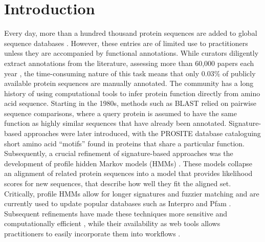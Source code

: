 \section*{Introduction}
Every day, more than a hundred thousand protein sequences are added to global sequence databases \cite{tremblstats}. However, these entries are of limited use to practitioners unless they are accompanied by functional annotations. While curators diligently extract annotations from the literature, assessing more than 60,000 papers each year \cite{uniprotlatest}, the time-consuming nature of this task means that only 0.03\% of publicly available protein sequences are manually annotated.
The community has a long history of using computational tools to infer protein function directly from amino acid sequence. Starting in the 1980s, methods such as BLAST \cite{blast} relied on pairwise sequence comparisons, where a query protein is assumed to have the same function as highly similar sequences that have already been annotated. Signature-based approaches were later introduced, with the PROSITE database \cite{bairoch1991prosite} cataloguing short amino acid ``motifs'' found in proteins that share a particular function. Subsequently, a crucial refinement of signature-based approaches was the development of profile hidden Markov models (HMMs) \cite{krogh1994hidden, eddyhmmreview}. These models collapse an alignment of related protein sequences into a model that provides likelihood scores for new sequences, that describe how well they fit the aligned set. Critically, profile HMMs allow for longer signatures and fuzzier matching and are currently used to update popular databases such as Interpro and Pfam \cite{pfamlatest, blum2021interpro}. Subsequent refinements have made these techniques more sensitive and computationally efficient \cite{altschul1997gapped, fasterhmmer, pfamlatest, soding2005protein, steinegger2019hh}, while their availability as web tools allows practitioners to easily incorporate them into workflows \cite{johnson2008ncbi, soding2005hhpred, potter2018hmmer, bernhofer2021predictprotein}.
